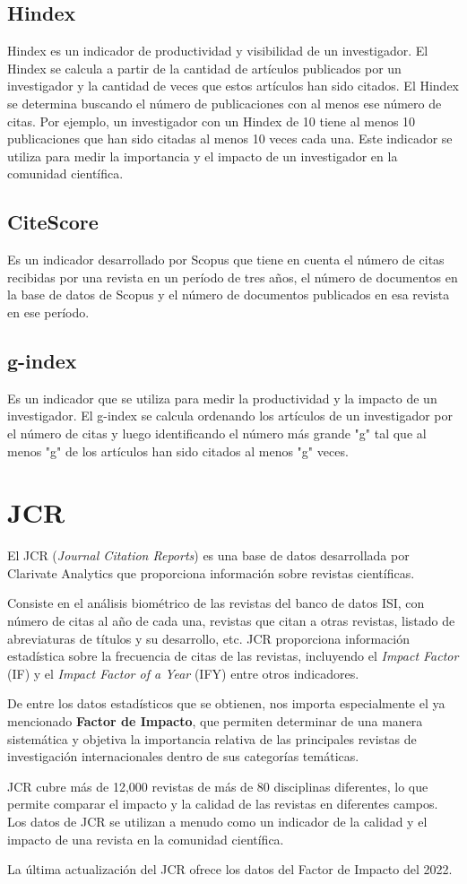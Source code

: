 \subsection{Hindex}
Hindex es un indicador de productividad y visibilidad de un investigador. El Hindex se calcula a partir de la cantidad de artículos publicados por un investigador y la cantidad de veces que estos artículos han sido citados. El Hindex se determina buscando el número de publicaciones con al menos ese número de citas. Por ejemplo, un investigador con un Hindex de 10 tiene al menos 10 publicaciones que han sido citadas al menos 10 veces cada una. Este indicador se utiliza para medir la importancia y el impacto de un investigador en la comunidad científica.

\subsection{CiteScore}
Es un indicador desarrollado por Scopus que tiene en cuenta el número de citas recibidas por una revista en un período de tres años, el número de documentos en la base de datos de Scopus y el número de documentos publicados en esa revista en ese período.

\subsection{g-index}
Es un indicador que se utiliza para medir la productividad y la impacto de un investigador. El g-index se calcula ordenando los artículos de un investigador por el número de citas y luego identificando el número más grande "g" tal que al menos "g" de los artículos han sido citados al menos "g" veces.

\section{JCR}
El JCR (\textit{Journal Citation Reports}) es una base de datos desarrollada por Clarivate Analytics que proporciona información sobre revistas científicas. 

Consiste en el análisis biométrico de las revistas del banco de datos ISI, con número de citas al año de cada una, revistas que citan a otras revistas, listado de abreviaturas de títulos y su desarrollo, etc. JCR proporciona información estadística sobre la frecuencia de citas de las revistas, incluyendo el \textit{Impact Factor} (IF) y el \textit{Impact Factor of a Year} (IFY) entre otros indicadores. 

De entre los datos estadísticos que se obtienen, nos importa especialmente el ya mencionado \textbf{Factor de Impacto}, que permiten determinar de una manera sistemática y objetiva la importancia relativa de las principales revistas de investigación internacionales dentro de sus categorías temáticas. 

JCR cubre más de 12,000 revistas de más de 80 disciplinas diferentes, lo que permite comparar el impacto y la calidad de las revistas en diferentes campos. Los datos de JCR se utilizan a menudo como un indicador de la calidad y el impacto de una revista en la comunidad científica.

La última actualización del JCR ofrece los datos del Factor de Impacto del 2022.

 
